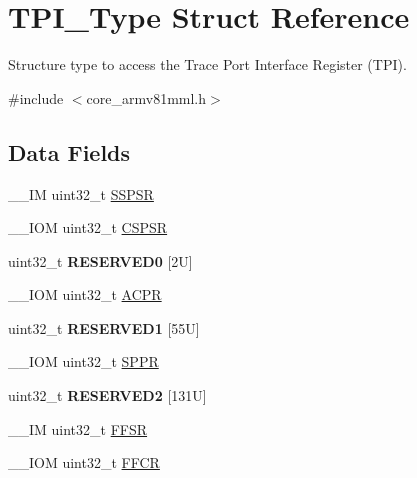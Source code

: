 \hypertarget{struct_t_p_i___type}{}\section{T\+P\+I\+\_\+\+Type Struct Reference}
\label{struct_t_p_i___type}


Structure type to access the Trace Port Interface Register (T\+PI).  




{\ttfamily \#include $<$core\+\_\+armv81mml.\+h$>$}

\subsection*{Data Fields}
\begin{DoxyCompactItemize}
\item 
\+\_\+\+\_\+\+IM uint32\+\_\+t \mbox{\hyperlink{struct_t_p_i___type_a1585b32a1ab860d0d77803475d08c7c6}{S\+S\+P\+SR}}
\item 
\+\_\+\+\_\+\+I\+OM uint32\+\_\+t \mbox{\hyperlink{struct_t_p_i___type_abf4a378b17278d98d2a5f9315fce7a5e}{C\+S\+P\+SR}}
\item 
\mbox{\label{struct_t_p_i___type_aa57754b8f88bb376d184aaf6fe74f391}} 
uint32\+\_\+t {\bfseries R\+E\+S\+E\+R\+V\+E\+D0} \mbox{[}2\+U\mbox{]}
\item 
\+\_\+\+\_\+\+I\+OM uint32\+\_\+t \mbox{\hyperlink{struct_t_p_i___type_a49a770cf0b7ec970f919f8ac22634fff}{A\+C\+PR}}
\item 
\mbox{\label{struct_t_p_i___type_a4d91e8d0f8791a2d137be359e6ca669f}} 
uint32\+\_\+t {\bfseries R\+E\+S\+E\+R\+V\+E\+D1} \mbox{[}55\+U\mbox{]}
\item 
\+\_\+\+\_\+\+I\+OM uint32\+\_\+t \mbox{\hyperlink{struct_t_p_i___type_ae9673e1acb75a46ed9852fd7a557cb7d}{S\+P\+PR}}
\item 
\mbox{\label{struct_t_p_i___type_ad34dc93fd7d41ef2c3365292cc8a178d}} 
uint32\+\_\+t {\bfseries R\+E\+S\+E\+R\+V\+E\+D2} \mbox{[}131\+U\mbox{]}
\item 
\+\_\+\+\_\+\+IM uint32\+\_\+t \mbox{\hyperlink{struct_t_p_i___type_a2a049b49e9da6772d38166397ce8fc70}{F\+F\+SR}}
\item 
\+\_\+\+\_\+\+I\+OM uint32\+\_\+t \mbox{\hyperlink{struct_t_p_i___type_afe3ca1410c32188d26be24c4ee9e180c}{F\+F\+CR}}
\item 

\end{DoxyCompactItemize}
